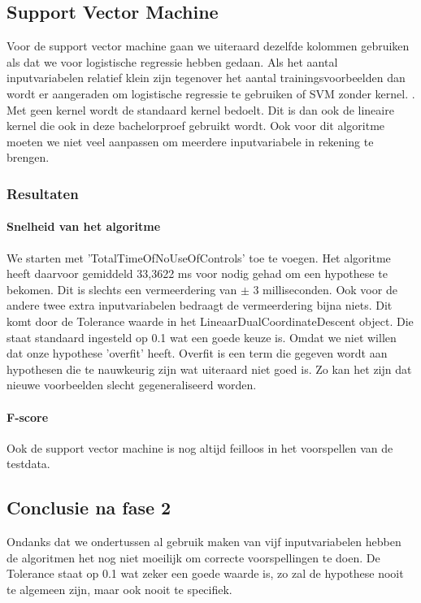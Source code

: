\newpage
\subsection{Support Vector Machine}
\label{sec:supportvectormachineFase2}
Voor de support vector machine gaan we uiteraard dezelfde kolommen gebruiken als dat we voor logistische regressie hebben gedaan. Als het aantal inputvariabelen relatief klein zijn tegenover het aantal trainingsvoorbeelden dan wordt er aangeraden om logistische regressie te gebruiken of SVM zonder kernel. \autocite{courseraSVM}. Met geen kernel wordt de standaard kernel bedoelt. Dit is dan ook de lineaire kernel die ook in deze bachelorproef gebruikt wordt.
Ook voor dit algoritme moeten we niet veel aanpassen om meerdere inputvariabele in rekening te brengen. 

\subsubsection{Resultaten}
\paragraph{Snelheid van het algoritme} 
We starten met 'TotalTimeOfNoUseOfControls' toe te voegen. Het algoritme heeft daarvoor gemiddeld 33,3622 ms voor nodig gehad om een hypothese te bekomen. Dit is slechts een vermeerdering van $\pm$ 3 milliseconden. Ook voor de andere twee extra inputvariabelen bedraagt de vermeerdering bijna niets. Dit komt door de Tolerance waarde in het LineaarDualCoordinateDescent object. Die staat standaard ingesteld op 0.1 wat een goede keuze is. Omdat we niet willen dat onze hypothese 'overfit' heeft. Overfit is een term die gegeven wordt aan hypothesen die te nauwkeurig zijn wat uiteraard niet goed is. Zo kan het zijn dat nieuwe voorbeelden slecht gegeneraliseerd worden. 


\paragraph{F-score}

Ook de support vector machine is nog altijd feilloos in het voorspellen van de testdata. 


\subsection{Conclusie na fase 2}
Ondanks dat we ondertussen al gebruik maken van vijf inputvariabelen hebben de algoritmen het nog niet moeilijk om correcte voorspellingen te doen. De Tolerance staat op 0.1 wat zeker een goede waarde is, zo zal de hypothese nooit te algemeen zijn, maar ook nooit te specifiek. 